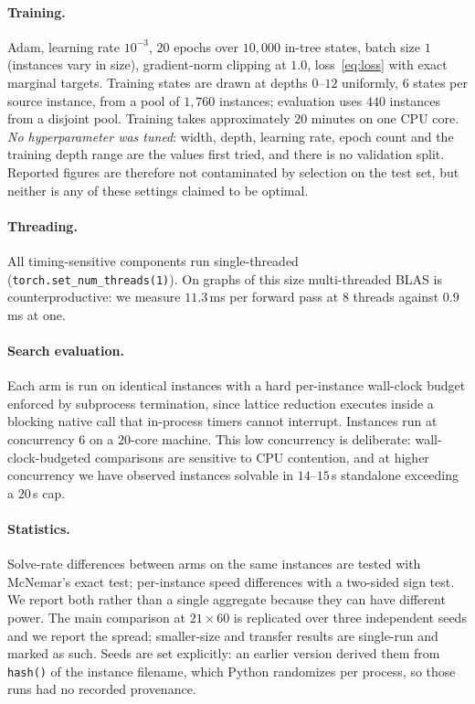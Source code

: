 \documentclass[preprint,12pt]{elsarticle}
\begin{document}
\paragraph{Training.} Adam, learning rate $10^{-3}$, $20$ epochs over $10{,}000$ in-tree states, batch size $1$ (instances vary in size), gradient-norm clipping at $1.0$, loss~\eqref{eq:loss} with exact marginal targets. Training states are drawn at depths $0$--$12$ uniformly, $6$ states per source instance, from a pool of $1{,}760$ instances; evaluation uses $440$ instances from a disjoint pool. Training takes approximately $20$ minutes on one CPU core. \emph{No hyperparameter was tuned}: width, depth, learning rate, epoch count and the training depth range are the values first tried, and there is no validation split. Reported figures are therefore not contaminated by selection on the test set, but neither is any of these settings claimed to be optimal.

\paragraph{Threading.} All timing-sensitive components run single-threaded (\texttt{torch.set\_\allowbreak num\_\allowbreak threads(1)}). On graphs of this size multi-threaded BLAS is counterproductive: we measure $11.3$\,ms per forward pass at $8$ threads against $0.9$\,ms at one.

\paragraph{Search evaluation.} Each arm is run on identical instances with a hard per-instance wall-clock budget enforced by subprocess termination, since lattice reduction executes inside a blocking native call that in-process timers cannot interrupt. Instances run at concurrency $6$ on a $20$-core machine. This low concurrency is deliberate: wall-clock-budgeted comparisons are sensitive to CPU contention, and at higher concurrency we have observed instances solvable in $14$--$15$\,s standalone exceeding a $20$\,s cap.

\paragraph{Statistics.} Solve-rate differences between arms on the same instances are tested with McNemar's exact test; per-instance speed differences with a two-sided sign test. We report both rather than a single aggregate because they can have different power. The main comparison at $21\times60$ is replicated over three independent seeds and we report the spread; smaller-size and transfer results are single-run and marked as such. Seeds are set explicitly: an earlier version derived them from \texttt{hash()} of the instance filename, which Python randomizes per process, so those runs had no recorded provenance.
\end{document}
